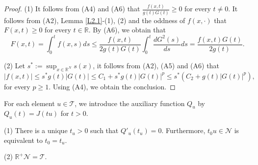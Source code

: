 \documentclass[reqno]{amsart}
\begin{document}
\begin{proof}
(1) It follows from (A4) and (A6) that $\frac{f(x,t)}{g(t)G(t)}\geq 0$ for every $t\neq0$. 
It follows from (A2), Lemma \ref{L2.1}-(1), (2) and the oddness of $f(x,\cdot)$ that 
$F(x,t)\geq 0$ for every $t\in \mathbb{R}$. By (A6), we obtain that
$$
F(x,t)=\int^t_0f(x,s)ds\leq \frac{f(x,t)}{2g(t)G(t)}\int^t_0\frac{dG^2(s)}{ds}ds
=\frac{f(x,t)G(t)}{2g(t)}.
$$

(2) Let $s^*:=\sup_{x\in{\mathbb{R}^N}}s(x)$, it follows from (A2), (A5) and (A6) that 
$$
|f(x,t)|\leq s^*g(t)|G(t)|\leq C_1+s^*g(t)|G(t)|^p\leq s^*(C_2+g(t)|G(t)|^p),
$$ 
for every $p\geq1$. Using (A4), we obtain  the conclusion.
\end{proof}

For each element  \( u \in \mathcal{T} \), we introduce the auxiliary function 
\( Q_u  \) by \( Q_u(t) = J(tu) \) for $t>0$.


\begin{lemma}\label{L3.2}
(1) There is a unique $t_u>0$ such that $Q'_u(t_u)=0$. Furthermore,  $t_0u\in\mathcal{N}$  is equivalent to  $t_0=t_u$.

(2) $\mathbb{R}^+\mathcal{N}=\mathcal{T}$.
\end{lemma}
\end{document}
